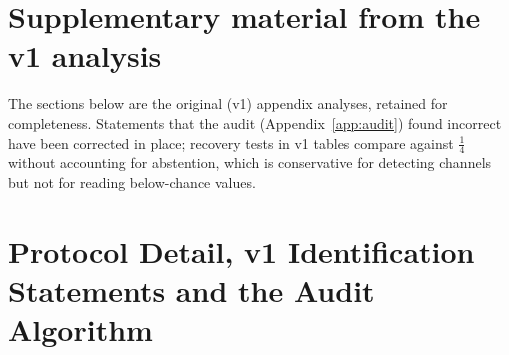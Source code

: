 
\section*{Supplementary material from the v1 analysis}
\noindent The sections below are the original (v1) appendix analyses, retained for completeness. Statements that the audit (Appendix~\ref{app:audit}) found incorrect have been corrected in place; recovery tests in v1 tables compare against $\tfrac14$ without accounting for abstention, which is conservative for detecting channels but not for reading below-chance values.

\section{Protocol Detail, v1 Identification Statements and the Audit Algorithm}\label{app:protocol}

